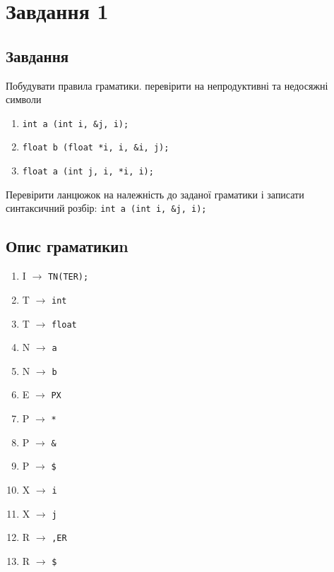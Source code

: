 \section{Завдання 1}
\subsection{Завдання}
Побудувати правила граматики. перевірити на непродуктивні та недосяжні символи
\begin{enumerate}
    \item \verb|int a (int i, &j, i);|
    \item \verb|float b (float *i, i, &i, j);|
    \item \verb|float a (int j, i, *i, i);|
\end{enumerate}
Перевірити ланцюжок на належність до заданої граматики і записати синтаксичний розбір: \verb|int a (int i, &j, i);|


\subsection{Опис граматикиn}
\begin{enumerate}
    \item  I $\to$ \verb|TN(TER);|
    \item  T $\to$ \verb|int|
    \item  T $\to$ \verb|float|
    \item  N $\to$ \verb|a|
    \item  N $\to$ \verb|b|
    \item  E $\to$ \verb|PX|
    \item  P $\to$ \verb|*|
    \item  P $\to$ \verb|&|
    \item  P $\to$ \verb|$|
    \item  X $\to$ \verb|i|
    \item  X $\to$ \verb|j|
    \item  R $\to$ \verb|,ER|
    \item  R $\to$ \verb|$|
\end{enumerate}


\newpage
